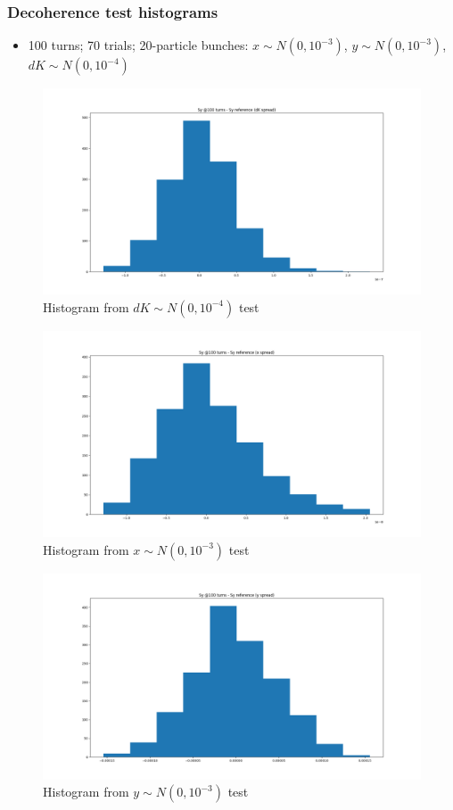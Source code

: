 \documentclass[pdf]{beamer}
\begin{document}
	\begin{frame}
		\frametitle{Decoherence test histograms}
		\begin{itemize}
			\item 100 turns; 70 trials; 20-particle bunches: $x \sim N(0, 10^{-3})$, $y \sim N(0, 10^{-3})$, $dK \sim N(0, 10^{-4})$
		\end{itemize}
		\begin{figure}
			\includegraphics[scale=.25]{Sy_hist_dK}
			\caption{Histogram from $dK \sim N(0, 10^{-4})$ test}
		\end{figure}
	\end{frame}
	\begin{frame}
		\begin{figure}
			\includegraphics[scale=.3]{Sy_hist_x}
			\caption{Histogram from $x \sim N(0, 10^{-3})$ test}
		\end{figure}
	\end{frame}
	\begin{frame}
		\begin{figure}
			\includegraphics[scale=.3]{Sy_hist_y}
			\caption{Histogram from $y \sim N(0, 10^{-3})$ test}
		\end{figure}
	\end{frame}
\end{document}
